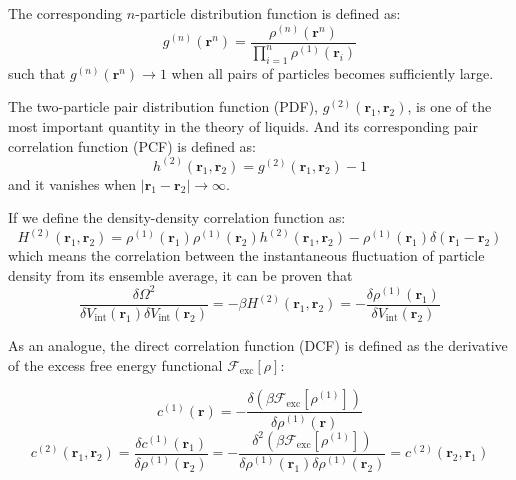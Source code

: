 The corresponding $n$-particle distribution function is defined as:
\begin{equation}
g^{(n)}(\mathbf{r}^{n})=\dfrac{\rho^{(n)}(\mathbf{r}^{n})}{\prod_{i=1}^{n}\rho^{(1)}(\mathbf{r}_{i})}
\end{equation}
such that $g^{(n)}(\mathbf{r}^{n})\rightarrow1$ when all pairs of
particles becomes sufficiently large.

The two-particle pair distribution function (\acs{PDF}), $g^{(2)}(\mathbf{r}_{1},\mathbf{r}_{2})$,
is one of the most important quantity in the theory of liquids. And
its corresponding pair correlation function (\acs{PCF}) is defined
as:
\begin{equation}
h^{(2)}(\mathbf{r}_{1},\mathbf{r}_{2})=g^{(2)}(\mathbf{r}_{1},\mathbf{r}_{2})-1
\end{equation}
and it vanishes when $\left|\mathbf{r}_{1}-\mathbf{r}_{2}\right|\rightarrow\infty$.

If we define the density-density correlation function as: 
\begin{equation}
H^{(2)}(\mathbf{r}_{1},\mathbf{r}_{2})=\rho^{(1)}(\mathbf{r}_{1})\rho^{(1)}(\mathbf{r}_{2})h^{(2)}(\mathbf{r}_{1},\mathbf{r}_{2})-\rho^{(1)}(\mathbf{r}_{1})\delta(\mathbf{r}_{1}-\mathbf{r}_{2})\label{eq:H-definition}
\end{equation}
which means the correlation \citep{Correlation_function_wiki} between
the instantaneous fluctuation of particle density from its ensemble
average, it can be proven that
\begin{equation}
\dfrac{\delta\Omega^{2}}{\delta V_{\mathrm{int}}(\mathbf{r}_{1})\delta V_{\mathrm{int}}(\mathbf{r}_{2})}=-\beta H^{(2)}(\mathbf{r}_{1},\mathbf{r}_{2})=-\dfrac{\delta\rho^{(1)}(\mathbf{r}_{1})}{\delta V_{\mathrm{int}}(\mathbf{r}_{2})}
\end{equation}

As an analogue, the direct correlation function (\acs{DCF}) is defined
as the derivative of the excess free energy functional $\mathcal{F}_{\mathrm{exc}}[\rho]$:

\begin{equation}
c^{(1)}(\mathbf{r})=-\dfrac{\delta(\beta\mathcal{F}_{\mathrm{exc}}[\rho^{(1)}])}{\delta\rho^{(1)}(\mathbf{r})}\label{eq:def-dcf}
\end{equation}
\begin{equation}
c^{(2)}(\mathbf{r}_{1},\mathbf{r}_{2})=\dfrac{\delta c^{(1)}(\mathbf{r}_{1})}{\delta\rho^{(1)}(\mathbf{r}_{2})}=-\dfrac{\delta^{2}(\beta\mathcal{F}_{\mathrm{exc}}[\rho^{(1)}])}{\delta\rho^{(1)}(\mathbf{r}_{1})\delta\rho^{(1)}(\mathbf{r}_{2})}=c^{(2)}(\mathbf{r}_{2},\mathbf{r}_{1})
\end{equation}

